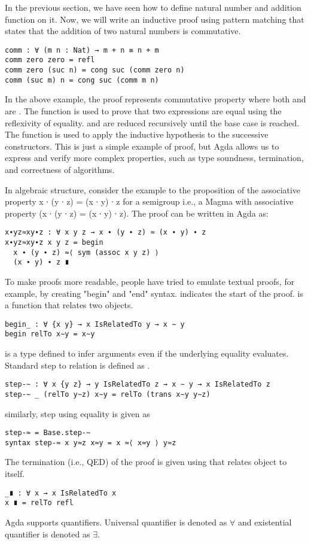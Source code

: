 In the previous section, we have seen how to define natural number and addition
function on it. Now, we will write an inductive proof using pattern matching
that states that the addition of two natural numbers is commutative.

\begin{verbatim}
comm : ∀ (m n : Nat) → m + n ≡ n + m
comm zero zero = refl
comm zero (suc n) = cong suc (comm zero n)
comm (suc m) n = cong suc (comm m n)
\end{verbatim}

In the above example, the proof  represents commutative
property where both  and  are . The
 function is used to prove that two expressions are equal using the
reflexivity of equality.  and  are
reduced recursively until the base case is reached. The  function
is used to apply the inductive hypothesis to the successive 
constructors. This is just a simple example of proof, but Agda allows us to
express and verify more complex properties, such as type soundness, termination,
and correctness of algorithms.

In algebraic structure, consider the example to the proposition of the associative property x ∙ (y ∙ z)
= (x ∙ y) ∙ z  for a semigroup i.e., a Magma with associative property (x ∙ (y ∙
z) = (x ∙ y) ∙ z). The proof can be written in Agda as:
\begin{verbatim}
x∙yz≈xy∙z : ∀ x y z → x ∙ (y ∙ z) ≈ (x ∙ y) ∙ z
x∙yz≈xy∙z x y z = begin 
  x ∙ (y ∙ z) ≈⟨ sym (assoc x y z) ⟩ 
  (x ∙ y) ∙ z ∎
\end{verbatim}
To make proofs more readable, people have tried to emulate textual proofs, for
example, by creating "begin" and "end" syntax.  indicates the start
of the proof.  is a function that relates two objects.
\begin{verbatim}
begin_ : ∀ {x y} → x IsRelatedTo y → x ∼ y
begin relTo x∼y = x∼y
\end{verbatim}
 is a type defined to infer arguments even if the underlying equality
evaluates. Standard step to relation is defined as .
\begin{verbatim}
step-∼ : ∀ x {y z} → y IsRelatedTo z → x ∼ y → x IsRelatedTo z
step-∼ _ (relTo y∼z) x∼y = relTo (trans x∼y y∼z)
\end{verbatim}
similarly, step using equality is given as
\begin{verbatim}
step-≈ = Base.step-∼
syntax step-≈ x y≈z x≈y = x ≈⟨ x≈y ⟩ y≈z
\end{verbatim}
The termination (i.e., QED) of the proof is given using  that relates object to itself.
\begin{verbatim}
_∎ : ∀ x → x IsRelatedTo x
x ∎ = relTo refl
\end{verbatim}
Agda supports quantifiers. Universal quantifier is denoted as \(\forall\) and
existential quantifier is denoted as \(\exists\).


